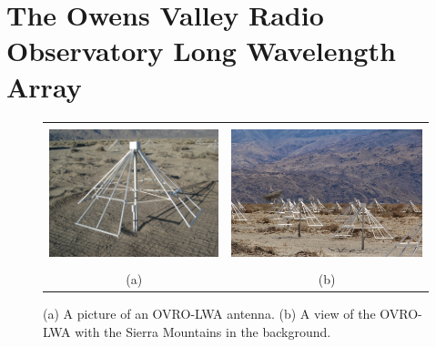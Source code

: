 \chapter{The Owens Valley Radio Observatory Long Wavelength Array}

\begin{bibunit}

\begin{figure}[t]
    \centering
    \begin{tabular}{cc}
        \includegraphics[height=4cm]{figures/chapter2/lwa-antenna} &
        \includegraphics[height=4cm]{figures/chapter2/ovro-lwa} \\
        (a) & (b) \\
    \end{tabular}
    \caption{
        (a) A picture of an OVRO-LWA antenna.
        (b) A view of the OVRO-LWA with the Sierra Mountains in the background.
    }
    \label{fig:ovro-lwa-pictures}
\end{figure}


\end{bibunit}
